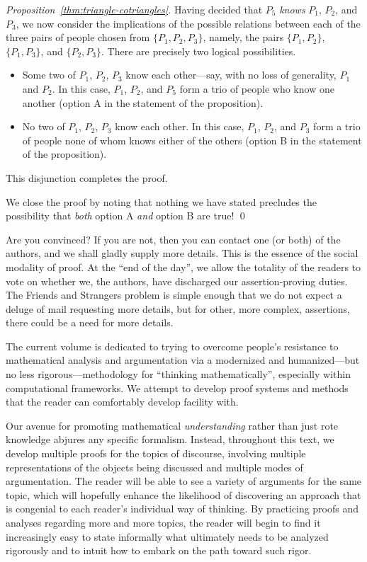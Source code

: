 \begin{proof}[Proposition~\ref{thm:triangle-cotriangles}]
\bigskip

\noindent
Having decided that $P_5$ {\em knows} $P_1$, $P_2$, and $P_3$, we now
consider the implications of the possible relations between each of
the three pairs of people chosen from $\{P_1, P_2, P_3\}$, namely, the
pairs  $\{P_1, P_2\}$, $\{P_1, P_3\}$, and $\{P_2, P_3\}$.  There
are precisely two logical possibilities.
\begin{itemize}
\item
Some two of $P_1$, $P_2$, $P_3$ know each other---say, with no loss of
generality, $P_1$ and $P_2$.  In this case, $P_1$, $P_2$, and $P_5$
form a trio of people who know one another (option A in the statement
of the proposition).
\item
No two of $P_1$, $P_2$, $P_3$ know each other.  In this case, $P_1$,
$P_2$, and $P_3$ form a trio of people none of whom knows either of
the others (option B in the statement of the proposition).
\end{itemize}
This disjunction completes the proof.

We close the proof by noting that nothing we have stated precludes the
possibility that {\em both} option A {\em and} option B are true!  \qed
\end{proof}

Are you convinced?  If you are not, then you can contact one (or both)
of the authors, and we shall gladly supply more details.  This is the
essence of the social modality of proof.  At the ``end of the day'',
we allow the totality of the readers to vote on whether we, the
authors, have discharged our assertion-proving duties.  The Friends
and Strangers problem is simple enough that we do not expect a deluge
of mail requesting more details, but for other, more complex,
assertions, there could be a need for more details.  
\bigskip

The current volume is dedicated to trying to overcome people's
resistance to mathematical analysis and argumentation via a modernized
and humanized---but no less rigorous---methodology for ``thinking
mathematically'', especially within computational frameworks.  We
attempt to develop proof systems and methods that the reader can
comfortably develop facility with.

Our avenue for promoting mathematical {\em understanding} rather than
just rote knowledge abjures any specific formalism.  Instead,
throughout this text, we develop multiple proofs for the topics of
discourse, involving multiple representations of the objects being
discussed and multiple modes of argumentation.  The reader will be
able to see a variety of arguments for the same topic, which will
hopefully enhance the likelihood of discovering an approach that is
congenial to each reader's individual way of thinking.  By practicing
proofs and analyses regarding more and more topics, the reader will
begin to find it increasingly easy to state informally what ultimately
needs to be analyzed rigorously and to intuit how to embark on the
path toward such rigor.


